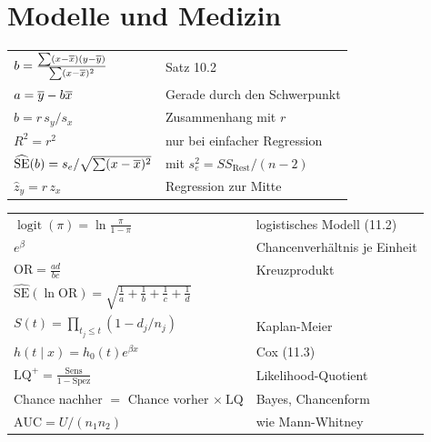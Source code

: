 \section{Modelle und Medizin}

\begin{merksatz}
\begin{center}
{\small
\renewcommand{\arraystretch}{1.6}
\begin{tabular}{@{}P{4.4cm}P{4.2cm}@{}}
\toprule
$b = \frac{\sum(x-\overline{x})(y-\overline y)}{\sum(x-\overline{x})^2}$ & Satz 10.2\\
$a = \overline y - b\overline{x}$ & Gerade durch den Schwerpunkt\\
$b = r\,s_y/s_x$ & Zusammenhang mit $r$\\
$R^2 = r^2$ & nur bei einfacher Regression\\
$\widehat{\mathrm{SE}}(b) = s_e/\sqrt{\sum(x-\overline{x})^2}$ & mit $s_e^2 = SS_{\text{Rest}}/(n-2)$\\
$\hat z_y = r\,z_x$ & Regression zur Mitte\\
\bottomrule
\end{tabular}}
\end{center}
\end{merksatz}

\begin{merksatz}
\begin{center}
{\small
\renewcommand{\arraystretch}{1.6}
\begin{tabular}{@{}P{4.4cm}P{4.2cm}@{}}
\toprule
$\operatorname{logit}(\pi) = \ln\frac{\pi}{1-\pi}$ & logistisches Modell (11.2)\\
$e^{\beta}$ & Chancenverhältnis je Einheit\\
$\mathrm{OR} = \frac{ad}{bc}$ & Kreuzprodukt\\
$\widehat{\mathrm{SE}}(\ln\mathrm{OR}) = \sqrt{\frac1a+\frac1b+\frac1c+\frac1d}$ & \\
$S(t) = \prod_{t_j \le t}(1-d_j/n_j)$ & Kaplan-Meier\\
$h(t\mid x) = h_0(t)e^{\beta x}$ & Cox (11.3)\\
$\mathrm{LQ}^{+} = \frac{\text{Sens}}{1-\text{Spez}}$ & Likelihood-Quotient\\
Chance nachher $=$ Chance vorher $\times\ \mathrm{LQ}$ & Bayes, Chancenform\\
$\mathrm{AUC} = U/(n_1n_2)$ & wie Mann-Whitney\\
\bottomrule
\end{tabular}}
\end{center}
\end{merksatz}

